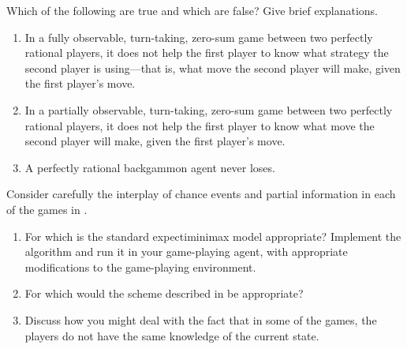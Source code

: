 \begin{exercise}
Which of the following are true and which are false? Give brief explanations.
\begin{enumerate}
\item In a fully observable, turn-taking, zero-sum game between two perfectly rational players,
it does not help the first player to know what strategy the second player is using---that is,
what move the second player will make, given the first player's move.
\item In a partially observable, turn-taking, zero-sum game between two perfectly rational players,
it does not help the first player to know what move the second player will make, given the first player's move.
\item A perfectly rational backgammon agent never loses.
\end{enumerate}
\end{exercise} 

\begin{exercise}
Consider carefully the interplay of chance events and partial
information in each of the games in 
.
\begin{enumerate}
\item  For which is the standard
expectiminimax model appropriate? Implement the algorithm and run it
in your game-playing agent, with appropriate modifications to the
game-playing environment.  
\item For which would the scheme described
in   be appropriate?
\item Discuss how you might deal with the fact that in some of the
games, the players do not have the same knowledge of the
current state.
\end{enumerate}
\end{exercise} 













